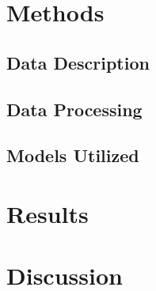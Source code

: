 \documentclass[manuscript,screen,review,nonacm]{acmart}
\begin{document}
\section{Methods}

\subsection{Data Description}

\subsection{Data Processing}

\subsection{Models Utilized}

\section{Results}

\section{Discussion}




\end{document}
